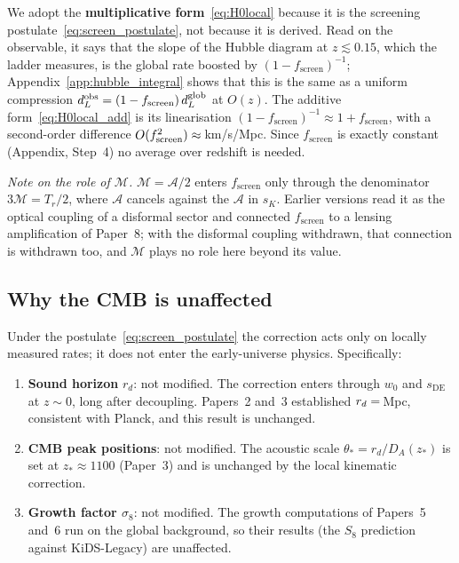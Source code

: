 \documentclass[12pt,a4paper]{article}
\newcommand{\MIRA}{\mathcal{M}}
\newcommand{\AURA}{\mathcal{A}}
\newcommand{\fsc}{f_{\mathrm{screen}}}
\newcommand{\sK}{s_K}          %
\newcommand{\sDE}{s_{\mathrm{DE}}} %
\begin{document}
We adopt the \textbf{multiplicative form}~\eqref{eq:H0local} because it is
the screening postulate~\eqref{eq:screen_postulate}, not because it is derived.
Read on the observable, it says that the slope of the Hubble diagram at
$z\lesssim0.15$, which the ladder measures, is the global rate boosted by
$(1-\fsc)^{-1}$; Appendix~\ref{app:hubble_integral} shows that this is the same
as a uniform compression $d_L^{\rm obs}=(1-\fsc)\,d_L^{\rm glob}$ at $O(z)$.
The additive form~\eqref{eq:H0local_add} is its linearisation
$(1-\fsc)^{-1}\approx1+\fsc$, with a second-order difference
$O(\fsc^2)\approx\val{p9_add_dif}$\,km/s/Mpc. Since $\fsc$ is exactly constant
(Appendix, Step~4) no average over redshift is needed.

\medskip
\noindent\textit{Note on the role of $\MIRA$.}
$\MIRA=\AURA/2$ enters $\fsc$ only through the denominator $3\MIRA=T_r/2$,
where $\AURA$ cancels against the $\AURA$ in $\sK$. Earlier versions read it as
the optical coupling of a disformal sector and connected $\fsc$ to a lensing
amplification of Paper~8; with the disformal coupling withdrawn, that
connection is withdrawn too, and $\MIRA$ plays no role here beyond its value.

\subsection{Why the CMB is unaffected}
\label{sec:CMBsafe}

Under the postulate~\eqref{eq:screen_postulate} the correction acts only on
locally measured rates; it does not enter the early-universe physics.
Specifically:
\begin{enumerate}
  \item \textbf{Sound horizon} $r_d$: not modified.
        The correction enters through $w_0$ and $\sDE$ at $z \sim 0$,
        long after decoupling.
        Papers~2 and~3 established $r_d = \val{rd_ssee_camb_d1}$\,Mpc, consistent with Planck,
        and this result is unchanged.
  \item \textbf{CMB peak positions}: not modified.
        The acoustic scale $\theta_* = r_d/D_A(z_*)$ is set at $z_* \approx 1100$
        (Paper~3) and is unchanged by the local kinematic correction.
  \item \textbf{Growth factor $\sigma_8$}: not modified.
        The growth computations of Papers~5 and~6 run on the global
        background, so their results (the $S_8$ prediction against
        KiDS-Legacy) are unaffected.
\end{enumerate}
\end{document}
